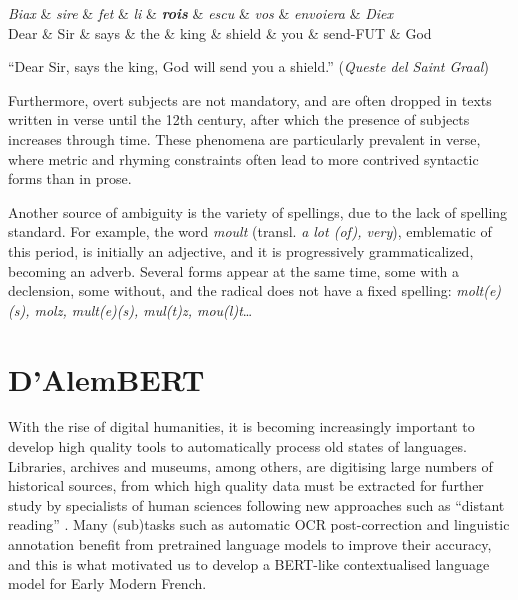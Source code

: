 \begin{center}
    \begin{dependency}[theme=simple]
        \begin{deptext}[row 2/.style={font=\small}]
            \textit{Biax} \& \textit{sire} \& \textit{fet} \& \textit{li} \& \textbf{\textit{rois}} \& \textit{escu} \& \textit{vos} \& \textit{envoiera} \& \textit{Diex} \\
            Dear \& Sir \& says \& the \& king \& shield \& you \& send-FUT \& God \\
        \end{deptext}
    \end{dependency}

    \raggedright
    \enquote{Dear Sir, says the king, God will send you a shield.} (\emph{Queste del Saint Graal})
\end{center}

Furthermore, overt subjects are not mandatory, and are often dropped in texts written in verse until the 12th century, after which the presence of subjects increases through time.
These phenomena are particularly prevalent in verse, where metric and rhyming constraints often lead to more contrived syntactic forms than in prose.

Another source of ambiguity is the variety of spellings, due to the lack of spelling standard. For example, the word \textit{moult} (transl. \textit{a lot (of), very}), emblematic of this period, is initially an adjective, and it is progressively grammaticalized, becoming an adverb. Several forms appear at the same time, some with a declension, some without, and the radical does not have a fixed spelling: \textit{molt(e)(s), molz, mult(e)(s), mul(t)z, mou(l)t}…

\section{D'AlemBERT}

With the rise of digital humanities, it is becoming increasingly important to develop high quality tools to automatically process old states of languages. Libraries, archives and museums, among others, are digitising large numbers of historical sources, from which high quality data must be extracted for further study by specialists of human sciences following new approaches such as ``distant reading'' \cite{moretti-2013-distant}. Many (sub)tasks such as automatic OCR post-correction \cite{rijhwani-etal-2021-lexically} and linguistic annotation \cite{camps-etal-2021-corpus} benefit from pretrained language models to improve their accuracy, and this is what motivated us to develop a BERT-like \cite{devlin-etal-2019-bert} contextualised language model for Early Modern French.

